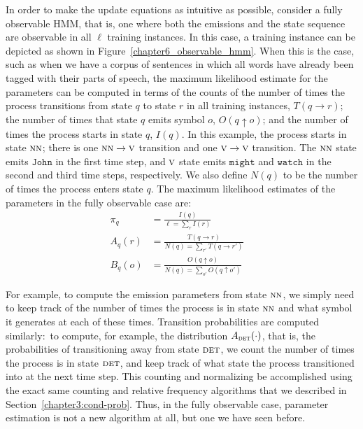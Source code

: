 In order to make the update equations as intuitive as possible,
consider a fully observable HMM, that is, one where both the emissions
and the state sequence are observable in all $\ell$ training
instances.  In this case, a training instance can be depicted as shown
in Figure~\ref{chapter6_observable_hmm}.  When this is the case, such
as when we have a corpus of sentences in which all words have already
been tagged with their parts of speech, the maximum likelihood
estimate for the parameters can be computed in terms of the counts of
the number of times the process transitions from state $q$ to state
$r$ in all training instances, $T(q \rightarrow r)$; the number of
times that state $q$ emits symbol $o$, $O(q \uparrow o)$; and the
number of times the process starts in state $q$, $I(q)$.  In this
example, the process starts in state $\textsc{nn}$; there is one
$\textsc{nn} \rightarrow \textsc{v}$ transition and one $\textsc{v}
\rightarrow \textsc{v}$ transition.  The $\textsc{nn}$ state emits
$\texttt{John}$ in the first time step, and $\textsc{v}$ state emits
$\texttt{might}$ and $\texttt{watch}$ in the second and third time
steps, respectively. We also define $N(q)$ to be the number of times
the process enters state $q$.  The maximum likelihood estimates of the
parameters in the fully observable case are:
\begin{align}
\label{eq:chapter6_hmmopt1} 
\pi_q   &= \frac{I(q)}{\ell = \sum_{r} I(r)} \quad \\
\label{eq:chapter6_hmmopt2} 
 A_q(r) &= \frac{T(q \rightarrow r)}{N(q) = \sum_{r'} T(q \rightarrow r')} \quad\\
\label{eq:chapter6_hmmopt3} 
 B_q(o) &= \frac{O(q \uparrow o)}{N(q) = \sum_{o'} O(q \uparrow o')}
\end{align}

\noindent For example, to compute the emission parameters from state
$\textsc{nn}$, we simply need to keep track of the number of times the
process is in state $\textsc{nn}$ and what symbol it generates at each
of these times.  Transition probabilities are computed similarly:\ to
compute, for example, the distribution $A_{\textsc{det}}(\cdot)$, that
is, the probabilities of transitioning away from state $\textsc{det}$,
we count the number of times the process is in state $\textsc{det}$,
and keep track of what state the process transitioned into at the next
time step.  This counting and normalizing be accomplished using the
exact same counting and relative frequency algorithms that we
described in Section~\ref{chapter3:cond-prob}.  Thus, in the fully
observable case, parameter estimation is not a new algorithm at all,
but one we have seen before.

